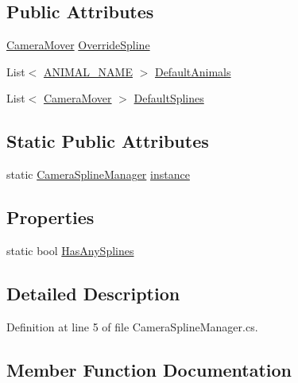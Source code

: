 \subsection*{Public Attributes}
\begin{DoxyCompactItemize}
\item 
\mbox{\hyperlink{class_camera_mover}{Camera\+Mover}} \mbox{\hyperlink{class_camera_spline_manager_a707b250a64b7eba5a30f22be6b9e9b5a}{Override\+Spline}}
\item 
List$<$ \mbox{\hyperlink{_animal_8cs_a2fa5713399b84d1b88dae9196837af50}{A\+N\+I\+M\+A\+L\+\_\+\+N\+A\+ME}} $>$ \mbox{\hyperlink{class_camera_spline_manager_ae17109e2b520f17de66d50c373710513}{Default\+Animals}}
\item 
List$<$ \mbox{\hyperlink{class_camera_mover}{Camera\+Mover}} $>$ \mbox{\hyperlink{class_camera_spline_manager_acb43d3ae06c5ea2f3423af3fec197567}{Default\+Splines}}
\end{DoxyCompactItemize}
\subsection*{Static Public Attributes}
\begin{DoxyCompactItemize}
\item 
static \mbox{\hyperlink{class_camera_spline_manager}{Camera\+Spline\+Manager}} \mbox{\hyperlink{class_camera_spline_manager_a7c92adc67f337e25be97de3969590ab5}{instance}}
\end{DoxyCompactItemize}
\subsection*{Properties}
\begin{DoxyCompactItemize}
\item 
static bool \mbox{\hyperlink{class_camera_spline_manager_aeb738532fbf6fc56516f66826298d981}{Has\+Any\+Splines}}
\end{DoxyCompactItemize}


\subsection{Detailed Description}


Definition at line 5 of file Camera\+Spline\+Manager.\+cs.



\subsection{Member Function Documentation}
\mbox{\label{class_camera_spline_manager_adabd9bdb36a1e809e1df7f8a01fc6a79}} 
